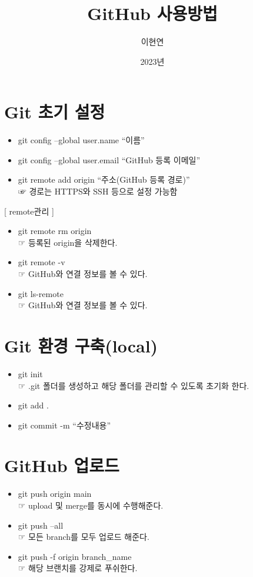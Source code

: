 \documentclass[12pt,a4paper]{oblivoir}
\title{GitHub 사용방법}
\author{이현연}
\date{2023년}
\begin{document}
\maketitle

\section[Git 초기 설정]{Git 초기 설정}
\begin{itemize}
\item git config --global user.name ``이름''
\item git config --global user.email ``GitHub 등록 이메일''
\item git remote add origin ``주소(GitHub 등록 경로)'' \\  ☞ 경로는 HTTPS와 SSH 등으로 설정 가능함
\end{itemize}


[ remote관리 ]
\begin{itemize}
\item git remote rm origin \\  ☞ 등록된 origin을 삭제한다.
\item git remote -v \\  ☞ GitHub와 연결 정보를 볼 수 있다.
\item git ls-remote \\  ☞ GitHub와 연결 정보를 볼 수 있다.
\end{itemize}
 
\section[Git 환경 구축(local)]{Git 환경 구축(local)}
\begin{itemize}
\item git init  \\  ☞ .git 폴더를 생성하고 해당 폴더를 관리할 수 있도록 초기화 한다.
\item git add .
\item git commit -m ``수정내용''
\end{itemize}

\section[GitHub 업로드]{GitHub 업로드}
\begin{itemize}
\item git push origin main \\  ☞ upload 및 merge를 동시에 수행해준다.
\item git push --all \\  ☞ 모든 branch를 모두 업로드 해준다.
\item git push -f origin branch\_name \\  ☞ 해당 브랜치를 강제로 푸쉬한다.
\end{itemize}
\end{document}
